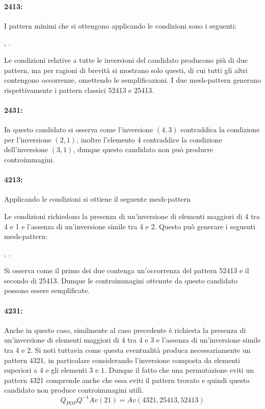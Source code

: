 \paragraph*{2413:} I pattern minimi che si ottengono applicando le condizioni sono i seguenti:
\begin{center}
, 
.
\end{center}
Le condizioni relative a tutte le inversioni del candidato producono pi\`u di due pattern, ma per ragioni di brevit\`a si mostrano solo questi, di cui tutti gli altri contengono occorrenze, omettendo le semplificazioni. I due mesh-pattern generano rispettivamente i pattern classici 52413 e 25413.
\paragraph*{2431:} In questo candidato si osserva come l'inversione $(4,3)$ contraddica la condizione per l'inversione $(2,1)$, inoltre l'elemento 4 contraddice la condizione dell'inversione $(3,1)$, dunque questo candidato non pu\`o produrre controimmagini.
\paragraph*{4213:} Applicando le condizioni si ottiene il seguente mesh-pattern
\begin{center}
\end{center}
Le condizioni richiedono la presenza di un'inversione di elementi maggiori di 4 tra 4 e 1 e l'assenza di un'inversione simile tra 4 e 2. Questo pu\`o generare i seguenti mesh-pattern:
\begin{center}
,
.
\end{center} 
Si osserva come il primo dei due contenga un'occorrenza del pattern 52413 e il secondo di 25413. Dunque le controimmagini ottenute da questo candidato possono essere semplificate.
\paragraph*{4231:} Anche in questo caso, similmente al caso precedente \`e richiesta la presenza di un'inversione di elementi maggiori di 4 tra 4 e 3 e l'assenza di un'inversione simile tra 4 e 2. Si noti tuttavia come questa eventualit\`a produca necessariamente un pattern 4321, in particolare considerando l'inversione composta da elementi superiori a 4 e gli elementi $3$ e $1$. Dunque il fatto che una permutazione eviti un pattern 4321 comprende anche che essa eviti il pattern trovato e quindi questo candidato non produce controimmagini utili. 
$$Q_{POP}Q^{-1}Av(21) = Av(4321, 25413, 52413)$$
